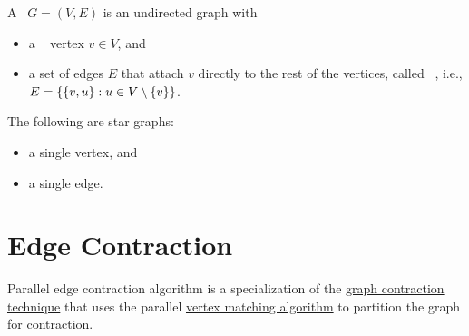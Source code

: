\begin{flex}
\begin{definition}
\label{def:graphcon::edge::analysis::star::star-graph}

A~ $G = (V,E)$ is an undirected graph with 
\begin{itemize}
\item a  ~ vertex $v \in V$, and 

\item a set of edges $E$ that attach   $v$ directly to the rest of the vertices, called
 ~, i.e., 
$E = \left\{ \left\{ v,u \right\} : u
    \in V \setminus \left\{ v \right\} \right\}$.
\end{itemize}
\end{definition}

\begin{example} 
The following are star graphs:
\begin{itemize}
\item a single vertex, and
\item a single edge.
\end{itemize}
\end{example}
\end{flex}

\section{Edge Contraction}
\label{sec:graphcon::edge::contraction}

\begin{algorithm}
\label{alg:graphcon::edge::contraction}
Parallel edge contraction algorithm is a specialization of the 
%
\href{def:graphcon::intro::graphcon::technique}{graph contraction technique}
%
that uses the parallel 
%
\href{alg:graphcon::edge::parallel-matching}{vertex matching algorithm}
%
to partition the graph for contraction.
\end{algorithm}

